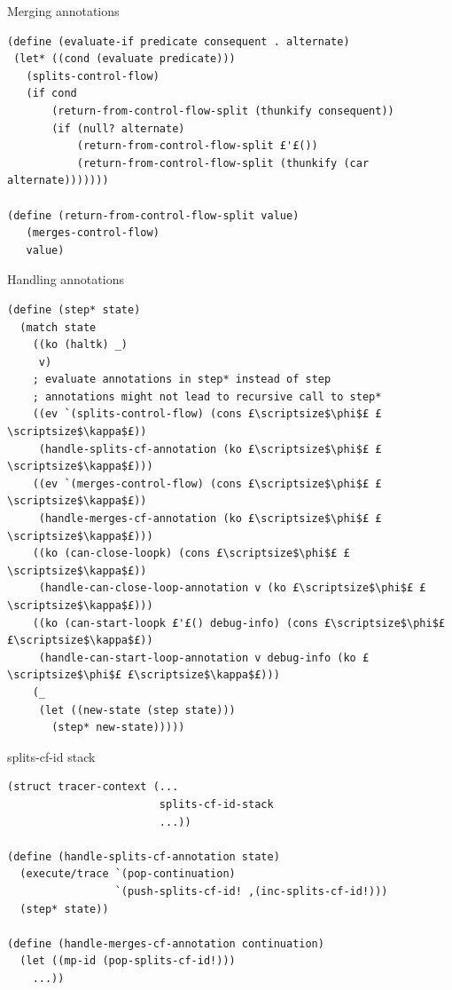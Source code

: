 \documentclass{beamer}
\begin{document}
\begin{frame}[fragile]{Merging annotations}
\begin{lstlisting}[basicstyle = \scriptsize\ttfamily, escapechar = £]
(define (evaluate-if predicate consequent . alternate)
 (let* ((cond (evaluate predicate)))
   (splits-control-flow)
   (if cond
       (return-from-control-flow-split (thunkify consequent))
       (if (null? alternate)
           (return-from-control-flow-split £'£())
           (return-from-control-flow-split (thunkify (car alternate)))))))

(define (return-from-control-flow-split value)
   (merges-control-flow)
   value)
\end{lstlisting}
\end{frame}

\begin{frame}[fragile]{Handling annotations}
\begin{lstlisting}[basicstyle = \scriptsize\ttfamily, escapechar = £]
(define (step* state)
  (match state
    ((ko (haltk) _)
     v)
    ; evaluate annotations in step* instead of step
    ; annotations might not lead to recursive call to step*
    ((ev `(splits-control-flow) (cons £\scriptsize$\phi$£ £\scriptsize$\kappa$£))
     (handle-splits-cf-annotation (ko £\scriptsize$\phi$£ £\scriptsize$\kappa$£)))
    ((ev `(merges-control-flow) (cons £\scriptsize$\phi$£ £\scriptsize$\kappa$£))
     (handle-merges-cf-annotation (ko £\scriptsize$\phi$£ £\scriptsize$\kappa$£)))
    ((ko (can-close-loopk) (cons £\scriptsize$\phi$£ £\scriptsize$\kappa$£))
     (handle-can-close-loop-annotation v (ko £\scriptsize$\phi$£ £\scriptsize$\kappa$£)))
    ((ko (can-start-loopk £'£() debug-info) (cons £\scriptsize$\phi$£ £\scriptsize$\kappa$£))
     (handle-can-start-loop-annotation v debug-info (ko £\scriptsize$\phi$£ £\scriptsize$\kappa$£)))
    (_
     (let ((new-state (step state)))
       (step* new-state)))))
\end{lstlisting}
\end{frame}

\begin{frame}[fragile]{splits-cf-id stack}
\begin{lstlisting}[basicstyle = \scriptsize\ttfamily, escapechar = £]
(struct tracer-context (...
                        splits-cf-id-stack
                        ...))
                        
(define (handle-splits-cf-annotation state)
  (execute/trace `(pop-continuation)
                 `(push-splits-cf-id! ,(inc-splits-cf-id!)))
  (step* state))
  
(define (handle-merges-cf-annotation continuation)
  (let ((mp-id (pop-splits-cf-id!)))
    ...))
\end{lstlisting}
\end{frame}
\end{document}
